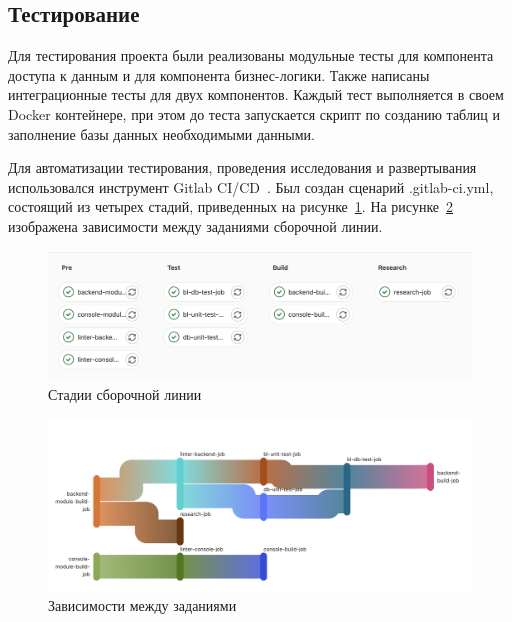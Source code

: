 \subsection{Тестирование}

Для тестирования проекта были реализованы модульные тесты для компонента доступа к данным и для компонента бизнес-логики. Также написаны интеграционные тесты для двух компонентов. Каждый тест выполняется в своем Docker контейнере, при этом до теста запускается скрипт по созданию таблиц и заполнение базы данных необходимыми данными. 

Для автоматизации тестирования, проведения исследования и развертывания использовался инструмент Gitlab CI/CD~\cite{ci}. Был создан сценарий .gitlab-ci.yml, состоящий из четырех стадий, приведенных на рисунке~\ref{stages}. На рисунке~\ref{needs} изображена зависимости между заданиями сборочной линии.

\begin{figure}[!h]
	\centering
	\includegraphics[width=\textwidth]{image/stages}
	\caption{Стадии сборочной линии}
	\label{stages}
\end{figure}

\begin{figure}[!h]
	\centering
	\includegraphics[width=\textwidth]{image/needs}
	\caption{Зависимости между заданиями}
	\label{needs}
\end{figure}





